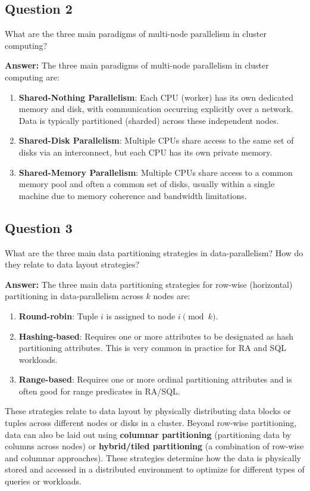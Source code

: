 \documentclass{article}
\begin{document}
\subsection*{Question 2}
What are the three main paradigms of multi-node parallelism in cluster computing? 

\textbf{Answer:}
The three main paradigms of multi-node parallelism in cluster computing are:
\begin{enumerate}
    \item \textbf{Shared-Nothing Parallelism}: Each CPU (worker) has its own dedicated memory and disk, with communication occurring explicitly over a network. Data is typically partitioned (sharded) across these independent nodes.
    \item \textbf{Shared-Disk Parallelism}: Multiple CPUs share access to the same set of disks via an interconnect, but each CPU has its own private memory.
    \item \textbf{Shared-Memory Parallelism}: Multiple CPUs share access to a common memory pool and often a common set of disks, usually within a single machine due to memory coherence and bandwidth limitations.
\end{enumerate}

\subsection*{Question 3}
What are the three main data partitioning strategies in data-parallelism? How do they relate to data layout strategies? 

\textbf{Answer:}
The three main data partitioning strategies for row-wise (horizontal) partitioning in data-parallelism across $k$ nodes are:
\begin{enumerate}
    \item \textbf{Round-robin}: Tuple $i$ is assigned to node $i \pmod k$.
    \item \textbf{Hashing-based}: Requires one or more attributes to be designated as hash partitioning attributes. This is very common in practice for RA and SQL workloads.
    \item \textbf{Range-based}: Requires one or more ordinal partitioning attributes and is often good for range predicates in RA/SQL.
\end{enumerate}
These strategies relate to data layout by physically distributing data blocks or tuples across different nodes or disks in a cluster. Beyond row-wise partitioning, data can also be laid out using \textbf{columnar partitioning} (partitioning data by columns across nodes) or \textbf{hybrid/tiled partitioning} (a combination of row-wise and columnar approaches). These strategies determine how the data is physically stored and accessed in a distributed environment to optimize for different types of queries or workloads.
\end{document}
